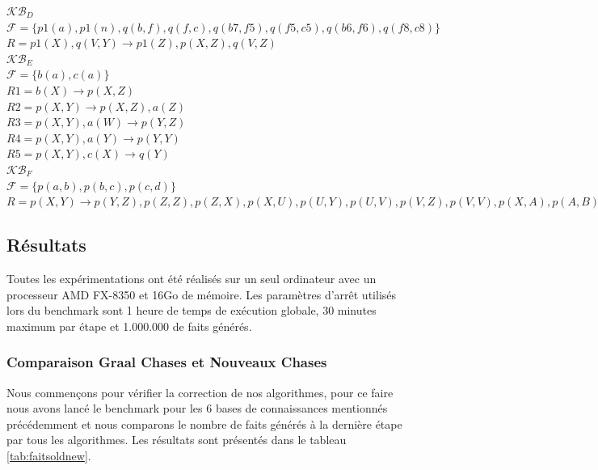 \textbf{$\mathcal{KB}_D$}\\
$\mathcal{F} = \{p1(a), p1(n),q(b,f),q(f,c),q(b7,f5),q(f5,c5),q(b6,f6),q(f8,c8)\}$ \\
$R = p1(X), q(V,Y) \rightarrow p1(Z),p(X,Z),q(V,Z)$\\

\textbf{$\mathcal{KB}_E$}\\
$\mathcal{F} = \{b(a), c(a)\}$\\
$R1 = b(X) \rightarrow p(X,Z)$\\
$R2 = p(X,Y) \rightarrow p(X,Z), a(Z)$\\
$R3 = p(X,Y), a(W) \rightarrow p(Y,Z)$\\
$R4 = p(X,Y), a(Y) \rightarrow p(Y,Y)$\\
$R5 = p(X,Y), c(X) \rightarrow q(Y)$\\

\textbf{$\mathcal{KB}_F$}\\
$\mathcal{F} = \{p(a,b), p(b,c), p(c,d)\}$\\
$R = p(X,Y) \rightarrow p(Y,Z), p(Z,Z), p(Z,X), p(X,U), p(U,Y), p(U,V), p(V,Z), p(V,V), p(X,A), p(A,B), p(B,Y)$

\subsection{Résultats}

Toutes les expérimentations ont été réalisés sur un seul ordinateur avec un processeur AMD FX-8350 et 16Go de mémoire. Les paramètres d'arrêt utilisés lors du benchmark sont 1 heure de temps de exécution globale, 30 minutes maximum par étape et 1.000.000 de faits générés.

\subsubsection{Comparaison Graal Chases et Nouveaux Chases}
Nous commençons pour vérifier la correction de nos algorithmes, pour ce faire nous avons lancé le benchmark pour les 6 bases de connaissances mentionnés précédemment et nous comparons le nombre de faits générés à la dernière étape par tous les algorithmes. Les résultats sont présentés dans le tableau \ref{tab:faitsoldnew}.


